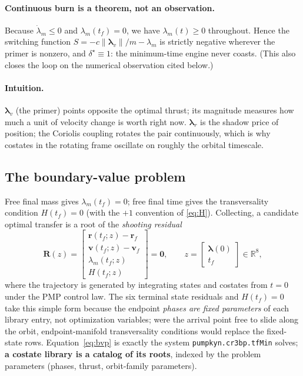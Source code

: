 \documentclass[11pt]{article}
\newcommand{\Rv}{\bm{r}}
\newcommand{\Vv}{\bm{v}}
\newcommand{\lr}{\bm{\lambda}_r}
\newcommand{\lv}{\bm{\lambda}_v}
\begin{document}
\paragraph{Continuous burn is a theorem, not an observation.} Because
$\dot\lambda_m \leq 0$ and $\lambda_m(t_f) = 0$, we have
$\lambda_m(t) \geq 0$ throughout. Hence the switching function
$S = -c\lVert\lv\rVert/m - \lambda_m$ is strictly negative wherever the
primer is nonzero, and $\delta^\star \equiv 1$: the minimum-time engine
never coasts. (This also closes the loop on the numerical observation
cited below.)

\paragraph{Intuition.} $\lv$ (the primer) points opposite the optimal
thrust; its magnitude measures how much a unit of velocity change is worth
right now. $\lr$ is the shadow price of position; the Coriolis coupling
rotates the pair continuously, which is why costates in the rotating frame
oscillate on roughly the orbital timescale.

\subsection{The boundary-value problem}

Free final mass gives $\lambda_m(t_f)=0$; free final time gives the
transversality condition $H(t_f) = 0$ (with the $+1$ convention of
\eqref{eq:H}). Collecting, a candidate optimal transfer is a root of the
\emph{shooting residual}
\begin{equation}
\bm R(z) =
\begin{bmatrix}
\Rv(t_f;z) - \Rv_f\\[2pt]
\Vv(t_f;z) - \Vv_f\\[2pt]
\lambda_m(t_f;z)\\[2pt]
H(t_f;z)
\end{bmatrix} = \bm 0,
\qquad
z = \begin{bmatrix}\bm\lambda(0)\\ t_f\end{bmatrix}\in\mathbb{R}^8,
\label{eq:bvp}
\end{equation}
where the trajectory is generated by integrating states and costates from
$t=0$ under the PMP control law. The six terminal state residuals and
$H(t_f)=0$ take this simple form because the endpoint \emph{phases are
fixed parameters} of each library entry, not optimization variables; were
the arrival point free to slide along the orbit, endpoint-manifold
transversality conditions would replace the fixed-state rows. Equation~\eqref{eq:bvp} is exactly the
system \texttt{pumpkyn.cr3bp.tfMin} solves; \textbf{a costate library is a
catalog of its roots}, indexed by the problem parameters (phases, thrust,
orbit-family parameters).
\end{document}
